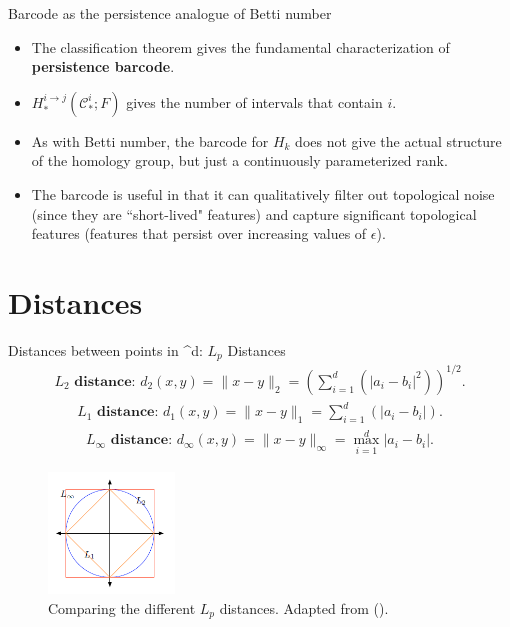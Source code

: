 \documentclass[xcolor={dvipsnames,svgnames}]{beamer}
\begin{document}
\begin{frame}{Barcode as the persistence analogue of Betti number}
\begin{itemize}
    \item The classification theorem gives the fundamental characterization of \textbf{persistence barcode}.
    \item $H_*^{i\to j}(\mathscr{C}^i_*; F)$ gives the number of intervals that contain $i$.
    \item As with Betti number, the barcode for $H_k$ does not give the actual structure of the homology group, but just a continuously parameterized rank. 
    \item The barcode is useful in that it can qualitatively filter out topological noise (since they are ``short-lived" features) and capture significant topological features (features that persist over increasing values of $\epsilon$).
\end{itemize}
\end{frame}


\section{Distances}
\begin{frame}{Distances between points in \RR^d: $L_p$ Distances}
\begin{align}
      \textbf{$L_2$ distance: } d_2(x,y) = \|x - y\|_2 = \left(\sum_{i=1}^d(|a_i - b_i|^2)\right)^{1/2}.
\end{align}
\begin{align}
      \textbf{$L_1$ distance: } d_1(x,y) = \|x - y\|_1 = \sum_{i=1}^d(|a_i - b_i|).
\end{align}
\begin{align}
      \textbf{$L_\infty$ distance: } d_\infty(x,y) = \|x - y\|_\infty = \max_{i=1}^d |a_i - b_i|.
\end{align}




\begin{figure}[H]
    \centering
        \includegraphics[width=0.3\textwidth]{figures/Lp-distances.png}
        \caption{Comparing the different $L_p$ distances. Adapted from (\cite{phillips_notes}).}
\end{figure}

\end{frame}
\end{document}
